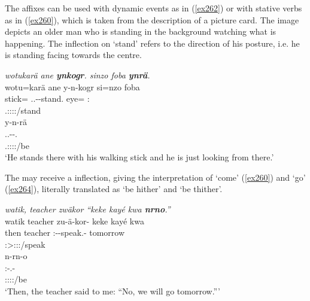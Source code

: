 The  affixes can be used with dynamic events as in (\ref{ex262}) or with stative verbs as in (\ref{ex260}), which is taken from the description of a picture card. The image depicts an older man who is standing in the background watching what is happening. The  inflection on `stand' refers to the direction of his posture, i.e. he is standing facing towards the  centre.

\begin{exe}
	\ex \emph{wotukarä ane \textbf{ynkogr}. sinzo foba \textbf{ynrä}.}\\
	\glll wotu=karä ane y-n-kogr si=nzo foba\\
	stick=\Prop{} \Dem{} \Tsg.\Masc.\Alph-\Venit-stand.\Ndu{} eye=\Only{} \Dist:\Abl{}\\
	{} {} \footnotesize{\Tsg.\Masc:\Sbj:\Nonpast:\Ipfv:\Venit/stand} {} {}\\
	\sn
	\glll y-n-rä\\
	\Tsg.\Masc.\Alph-\Venit-\Cop.\Ndu\\
	\footnotesize{\Tsg.\Masc:\Sbj:\Nonpast:\Ipfv:\Venit/be}\\
	\trans `He stands there with his walking stick and he is just looking from there.'\\
	\label{ex260}
\end{exe}

The  may receive a  inflection, giving the interpretation of `come' (\ref{ex260}) and `go' (\ref{ex264}), literally translated as `be hither' and `be thither'.

\begin{exe}
	\ex \emph{watik, teacher zwäkor ``keke kayé kwa \textbf{nrno}.''}\\
	\glll watik teacher zu-ä-kor-\Zero{} keke kayé kwa\\
	then teacher \Fsg:\Gam-\Ndu-speak.\Rs-\Stsg{} \Neg{} tomorrow \Fut{}\\
	{} {} \footnotesize{\Stsg:\Sbj>\Fsg:\Obj:\Rpst:\Pfv/speak} {} {} {}\\
	\sn
	\glll n-rn-o\\
	\Fnsg:\Alph-\Cop.\Du-\Andat{}\\
	\footnotesize{\Fdu:\Sbj:\Nonpast:\Ipfv:\Andat/be}\\
	\trans `Then, the teacher said to me: ``No, we will go tomorrow.'''\\
	\label{ex264}
\end{exe}

